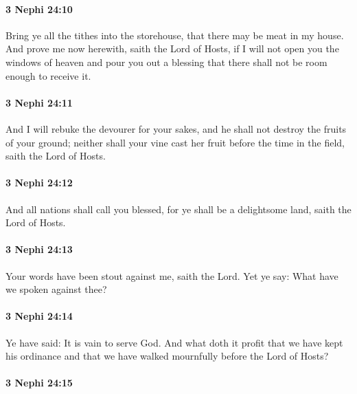 		\paragraph{3 Nephi 24:10} %
			\label{3NEPHI-24-10}

			Bring ye all the tithes into the storehouse,
			that there may be meat in my house.
			And prove me now herewith, saith the Lord of Hosts,
			if I will not open you the windows of heaven
			and pour you out a blessing
			that there shall not be room enough to receive it.

		\paragraph{3 Nephi 24:11} %
			\label{3NEPHI-24-11}

			And I will rebuke the devourer for your sakes,
			and he shall not destroy the fruits of your ground;
			neither shall your vine cast her fruit before the time in the field,
			saith the Lord of Hosts.

		\paragraph{3 Nephi 24:12} %
			\label{3NEPHI-24-12}

			And all nations shall call you blessed,
			for ye shall be a delightsome land,
			saith the Lord of Hosts.

		\paragraph{3 Nephi 24:13} %
			\label{3NEPHI-24-13}

			Your words have been stout against me, saith the Lord.
			Yet ye say: What have we spoken against thee?

		\paragraph{3 Nephi 24:14} %
			\label{3NEPHI-24-14}

			Ye have said: It is vain to serve God.
			And what doth it profit that we have kept his ordinance
			and that we have walked mournfully before the Lord of Hosts?

		\paragraph{3 Nephi 24:15} %
			\label{3NEPHI-24-15}

